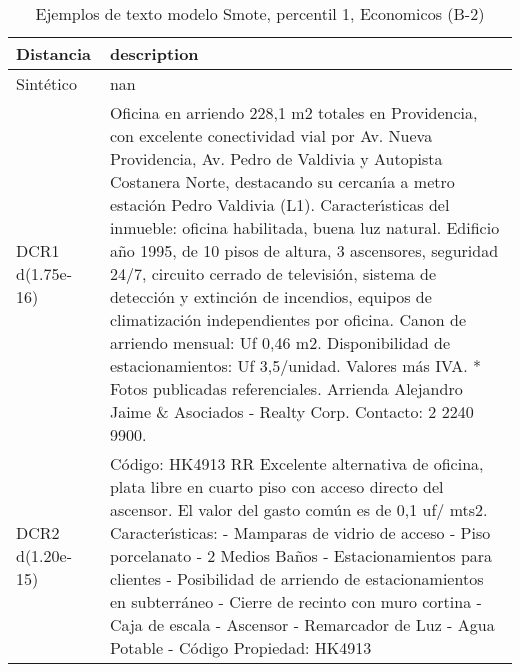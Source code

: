 \begin{table}[H]
\centering
\fontsize{10}{14}\selectfont
\caption{Ejemplos de texto modelo Smote, percentil 1, Economicos (B-2)}
\label{table-example-economicos-b-2-smote-enc-1p-text}
\begin{tabular}{|l|m{35em}|}
\hline
\rowcolor[gray]{0.8}
Distancia & description \\
\hline Sintético & nan \\
\hline DCR1 d(1.75e-16) & Oficina en arriendo 228,1 m2 totales en Providencia, con excelente conectividad vial por Av. Nueva Providencia, Av. Pedro de Valdivia y Autopista Costanera Norte, destacando su cercan{\'\i}a a metro estaci\'on Pedro Valdivia (L1).  Caracter{\'\i}sticas del inmueble: oficina habilitada, buena luz natural. Edificio a\~no 1995, de 10 pisos de altura, 3 ascensores, seguridad 24/7, circuito cerrado de televisi\'on, sistema de detecci\'on y extinci\'on de incendios, equipos de climatizaci\'on independientes por oficina.  Canon de arriendo mensual: Uf 0,46 m2. Disponibilidad de estacionamientos: Uf 3,5/unidad. Valores m\'as IVA.  * Fotos publicadas referenciales. Arrienda Alejandro Jaime \& Asociados - Realty Corp. Contacto: 2 2240 9900. \\
\hline DCR2 d(1.20e-15) & C\'odigo: HK4913 RR  Excelente alternativa de oficina, plata libre en cuarto piso con acceso directo del ascensor. El valor del gasto com\'un es de 0,1 uf/ mts2.  Caracter{\'\i}sticas: - Mamparas de vidrio de acceso - Piso porcelanato - 2 Medios Ba\~nos - Estacionamientos para clientes - Posibilidad de arriendo de estacionamientos en subterr\'aneo - Cierre de recinto con muro cortina - Caja de escala - Ascensor - Remarcador de Luz - Agua Potable - C\'odigo Propiedad: HK4913 \\
\hline
\end{tabular}
\end{table}
